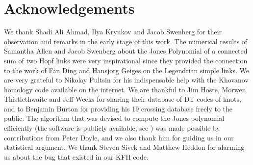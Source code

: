 \documentclass{article}
\theoremstyle{plain}
\begin{document}
    \section{Acknowledgements}
        We thank Shadi Ali Ahmad, Ilya Kryukov and Jacob Swenberg for their
        observation and remarks in the early stage of this work. The numerical
        results of Samantha Allen and Jacob Swenberg about the Jones Polynomial
        of a connected sum of two Hopf links were very inspirational since they
        provided the connection to the work of Fan Ding and Hansjorg Geiges on
        the Legendrian simple links. We are very grateful to Nikolay Pultsin
        for his indispensable help with the Khovanov homology code available
        on the internet. We are thankful to Jim Hoste, Morwen Thistlethwaite
        and Jeff Weeks for sharing their database of DT codes of knots, and
        to Benjamin Burton for providing his 19 crossing database freely to
        the public. The algorithm that was devised to compute the Jones
        polynomial efficiently (the software is publicly available,
        see \cite{MaguireLibtmpl}) was made possible by contributions from
        Peter Doyle, and we also thank him for guiding us in our statistical
        argument. We thank Steven Sivek and Matthew Heddon
        for alarming us about the bug that existed in our KFH code.
    \newpage
\end{document}
